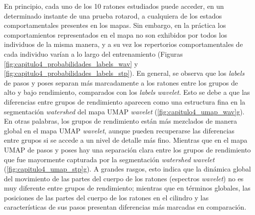 En principio, cada uno de los 10 ratones estudiados puede acceder, en un determinado instante de una prueba rotarod, a cualquiera de los estados comportamentales presentes en los mapas. Sin embargo, en la práctica los comportamientos representados en el mapa no son exhibidos por todos los individuos de la misma manera, y a su vez los repertorios comportamentales de cada individuo varían a lo largo del entrenamiento (Figuras \ref{fig:capitulo4_probabilidades_labels_wav} y \ref{fig:capitulo4_probabilidades_labels_stp}). En general, se observa que los \textit{labels} de pasos y poses separan más marcadamente a los ratones entre los grupos de alto y bajo rendimiento, comparados con los \textit{labels} \textit{wavelet}. Esto se debe a que las diferencias entre grupos de rendimiento aparecen como una estructura fina en la segmentación \textit{watershed} del mapa UMAP \textit{wavelet} (\autoref{fig:capitulo4_umap_wav}g). En otras palabras, los grupos de rendimiento están más mezclados de manera global en el mapa UMAP \textit{wavelet}, aunque pueden recuperarse las diferencias entre grupos si se accede a un nivel de detalle más fino. Mientras que en el mapa UMAP de pasos y poses hay una separación clara entre los grupos de rendimiento que fue mayormente capturada por la segmentación \textit{watershed} \textit{wavelet} (\autoref{fig:capitulo4_umap_stp}g). A grandes rasgos, esto indica que la dinámica global del movimiento de las partes del cuerpo de los ratones (espectros \textit{wavelet}) no es muy diferente entre grupos de rendimiento; mientras que en términos globales, las posiciones de las partes del cuerpo de los ratones en el cilindro y las características de sus pasos presentan diferencias más marcadas en comparación.


